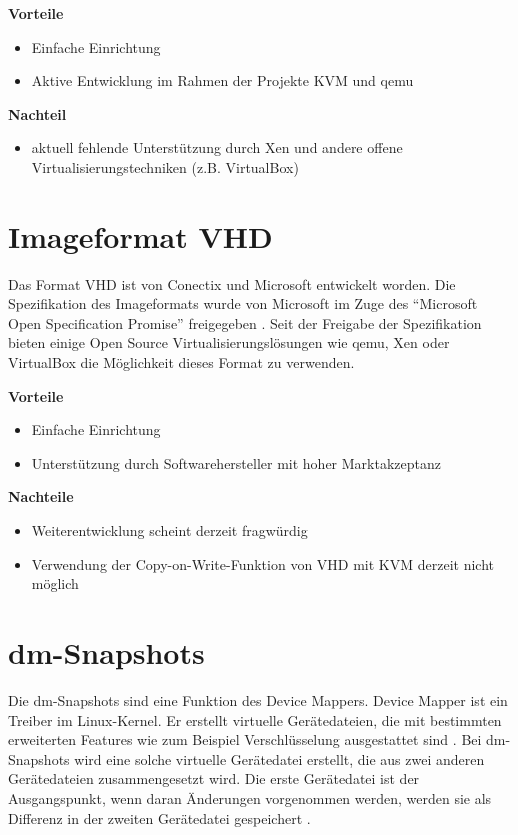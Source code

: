 \textbf{Vorteile}
\begin{itemize}
 \item Einfache Einrichtung
 \item Aktive Entwicklung im Rahmen der Projekte KVM und qemu
\end{itemize}

\textbf{Nachteil}
\begin{itemize}
 \item aktuell fehlende Unterstützung durch Xen und andere offene Virtualisierungstechniken (z.B. VirtualBox)
\end{itemize}

\section{Imageformat VHD}
Das Format VHD ist von Conectix und Microsoft entwickelt worden. Die Spezifikation des Imageformats wurde von Microsoft im Zuge des ``Microsoft Open Specification Promise'' freigegeben \cite{Msosp} \cite{Vhdspec}. Seit der Freigabe der Spezifikation bieten einige Open Source Virtualisierungslösungen wie qemu, Xen oder VirtualBox die Möglichkeit dieses Format zu verwenden.   

\textbf{Vorteile}
\begin{itemize}
 \item Einfache Einrichtung
 \item Unterstützung durch Softwarehersteller mit hoher Marktakzeptanz
\end{itemize}

\textbf{Nachteile}
\begin{itemize}
 \item Weiterentwicklung scheint derzeit fragwürdig
 \item Verwendung der Copy-on-Write-Funktion von VHD mit KVM derzeit nicht möglich
\end{itemize}

\section{dm-Snapshots}
Die dm-Snapshots sind eine Funktion des Device Mappers. Device Mapper ist ein Treiber im Linux-Kernel. Er erstellt virtuelle Gerätedateien, die mit bestimmten erweiterten Features wie zum Beispiel Verschlüsselung ausgestattet sind \cite{dmmbroz}. Bei dm-Snapshots wird eine solche virtuelle Gerätedatei erstellt, die aus zwei anderen Gerätedateien zusammengesetzt wird. Die erste Gerätedatei ist der Ausgangspunkt, wenn daran Änderungen vorgenommen werden, werden sie als Differenz in der zweiten Gerätedatei gespeichert \cite{Dmkerneldoc}. 

